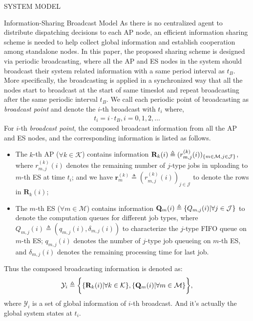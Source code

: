 \documentclass[10pt, conference, letterpaper]{IEEEtran}
\newcommand{\mat}{\mathbf}
\newcommand{\define}{\triangleq}
\renewcommand{\vec}{\mathbf}
\DeclarePairedDelimiter{\set}{\{}{\}}
\DeclarePairedDelimiter{\Brace}{\bigg\{}{\bigg\}}
\newcommand{\apSet}{\mathcal{K}}
\newcommand{\esSet}{\mathcal{M}}
\newcommand{\jSpace}{\mathcal{J}}
\newcommand{\Obsv}{\mathcal{Y}}
\begin{document}
\begin{section}{SYSTEM MODEL}
        \begin{subsection}{Information-Sharing Broadcast Model}
            As there is no centralized agent to distribute dispatching decisions to each AP node, an efficient information sharing scheme is needed to help collect global information and establish cooperation among standalone nodes.
            In this paper, the proposed sharing scheme is designed via periodic broadcasting, where all the AP and ES nodes in the system should broadcast their system related information with a same period interval as $t_B$. More specifically, the broadcasting is applied in a synchronized way that all the nodes start to broadcast at the start of same timeslot and repeat broadcasting after the same periodic interval $t_B$. We call each periodic point of broadcasting as \emph{broadcast point} and denote the $i$-th broadcast with $t_i$ where,
            \begin{align}
                t_i = i \cdot t_B, i=0,1,2,\dots
            \end{align}
            For $i$-th \emph{broadcast point}, the composed broadcast information from all the AP and ES nodes, and the corresponding information is listed as follows.
            \begin{itemize}
                \item The $k$-th AP ($\forall k\in\apSet$) contains information $\mat{R}_k(i) \define (r^{(k)}_{m,j}(i))_{\set{m\in\esSet,j\in\jSpace}}$, where $r^{(k)}_{m,j}(i)$ denotes the remaining number of $j$-type jobs in uploading to $m$-th ES at time $t_i$; and we have $\vec{r}^{(k)}_{m} \define (r^{(k)}_{m,j}(i))_{j\in\jSpace}$ to denote the rows in $\vec{R}_k(i)$;
                \item The $m$-th ES ($\forall m\in\esSet$) contains information $\vec{Q}_m(i) \define \set{Q_{m,j}(i)|\forall j\in\jSpace}$ to denote the computation queues for different job types, where $Q_{m,j}(i) \define (q_{m,j}(i), \delta_{m,j}(i))$ to characterize the $j$-type FIFO queue on $m$-th ES; $q_{m,j}(i)$ denotes the number of $j$-type job queueing on $m$-th ES, and $\delta_{m,j}(i)$ denotes the remaining processing time for last job.
            \end{itemize}
            Thus the composed broadcasting information is denoted as:
            \begin{align}
                \Obsv_i \define
                        \Brace{
                            \set{\mat{R}_{k}(i)|\forall k\in\apSet},
                            \set{\vec{Q}_m(i)|\forall m\in\esSet}
                        },
            \end{align}
            where $\Obsv_i$ is a set of global information of $i$-th broadcast. And it's actually the global system states at $t_i$.


\end{subsection}
\end{section}
\end{document}
